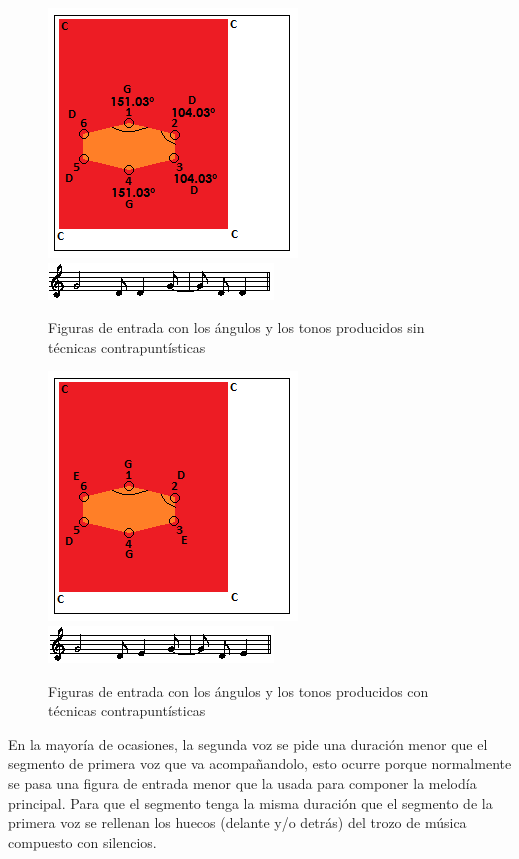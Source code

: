 		\begin{figure}[htbp]
		\centering
		\hspace*{0.0in}
		\includegraphics[scale=1]{graphics/simpletest4-F3.png}
		\includegraphics[scale=1]{graphics/simpletest4-F3-MEL2partitura.png}
		\caption{Figuras de entrada con los ángulos y los tonos producidos sin técnicas contrapuntísticas}
		\label{fig:Figura3Voz2}
		\end{figure}

		\begin{figure}[htbp]
		\centering
		\hspace*{0.0in}
		\includegraphics[scale=1]{graphics/simpletest4-F3_2.png}
		\includegraphics[scale=1]{graphics/simpletest4-F3_2-MEL2partitura.png}
		\caption{Figuras de entrada con los ángulos y los tonos producidos con técnicas contrapuntísticas}
		\label{fig:Figura4Voz2}
		\end{figure}

En la mayoría de ocasiones, la segunda voz se pide una duración menor que el segmento de primera voz que va acompañandolo, esto ocurre porque normalmente se pasa una figura de entrada menor que la usada para componer la melodía principal. Para que el segmento tenga la misma duración que el segmento de la primera voz se rellenan los huecos (delante y/o detrás) del trozo de música compuesto con silencios.

